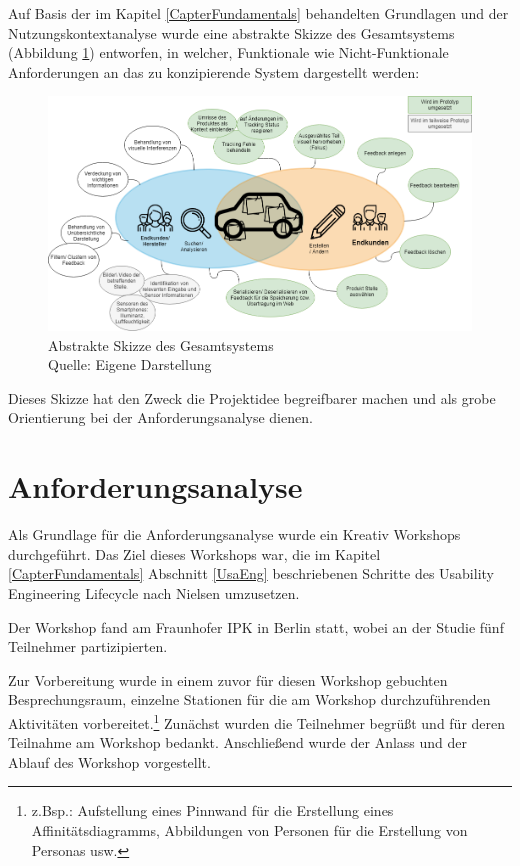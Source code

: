 Auf Basis der im Kapitel \ref{CapterFundamentals} behandelten Grundlagen und der Nutzungskontextanalyse wurde eine abstrakte Skizze des Gesamtsystems (Abbildung \ref{img:sysstem_sketch}) entworfen, in welcher, 
Funktionale wie Nicht-Funktionale Anforderungen an das zu konzipierende System dargestellt werden:

\begin{figure}[H]
	\centering
	\includegraphics[width=1.0\textwidth]{resources/conception/SystemSkizze.png}
	\caption{Abstrakte Skizze des Gesamtsystems \\Quelle: Eigene Darstellung}
	\label{img:sysstem_sketch}
\end{figure}

Dieses Skizze hat den Zweck die Projektidee begreifbarer machen und als grobe Orientierung bei der Anforderungsanalyse dienen.

\section{Anforderungsanalyse}\label{anforderungsanalyse}

Als Grundlage für die Anforderungsanalyse wurde ein Kreativ Workshops durchgeführt. Das Ziel dieses Workshops war, die im Kapitel \ref{CapterFundamentals} Abschnitt \ref{UsaEng} beschriebenen Schritte des Usability Engineering Lifecycle nach Nielsen umzusetzen.   

Der Workshop fand am Fraunhofer IPK in Berlin statt, wobei an der Studie fünf Teilnehmer partizipierten. %

Zur Vorbereitung wurde in einem zuvor für diesen Workshop gebuchten Besprechungsraum, einzelne Stationen für die am Workshop durchzuführenden Aktivitäten vorbereitet.\footnote{z.Bsp.: Aufstellung eines Pinnwand für die Erstellung eines Affinitätsdiagramms, Abbildungen von Personen für die Erstellung von Personas usw.} Zunächst wurden die Teilnehmer begrüßt und für deren Teilnahme am Workshop bedankt. 
Anschließend wurde der Anlass und der Ablauf des Workshop vorgestellt. 

